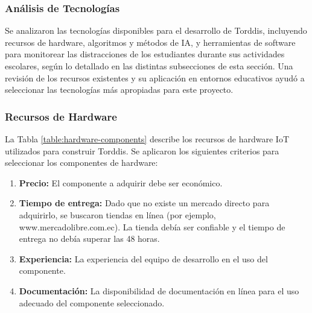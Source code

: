\documentclass[a4paper,fleqn]{cas-sc}
\begin{document}
	\subsubsection{Análisis de Tecnologías}
	Se analizaron las tecnologías disponibles para el desarrollo de Torddis, incluyendo recursos de hardware, algoritmos y métodos de IA, y herramientas de software para monitorear las distracciones de los estudiantes durante sus actividades escolares, según lo detallado en las distintas subsecciones de esta sección. Una revisión de los recursos existentes y su aplicación en entornos educativos ayudó a seleccionar las tecnologías más apropiadas para este proyecto.
	
	\subsubsection*{Recursos de Hardware}
	La Tabla \ref{table:hardware-components} describe los recursos de hardware IoT utilizados para construir Torddis. Se aplicaron los siguientes criterios para seleccionar los componentes de hardware:
	\begin{enumerate}
		\item \textbf{Precio:} El componente a adquirir debe ser económico.
		\item \textbf{Tiempo de entrega:} Dado que no existe un mercado directo para adquirirlo, se buscaron tiendas en línea (por ejemplo, www.mercadolibre.com.ec). La tienda debía ser confiable y el tiempo de entrega no debía superar las 48 horas.
		\item \textbf{Experiencia:} La experiencia del equipo de desarrollo en el uso del componente.
		\item \textbf{Documentación:} La disponibilidad de documentación en línea para el uso adecuado del componente seleccionado.
	\end{enumerate}
	
\end{document}
